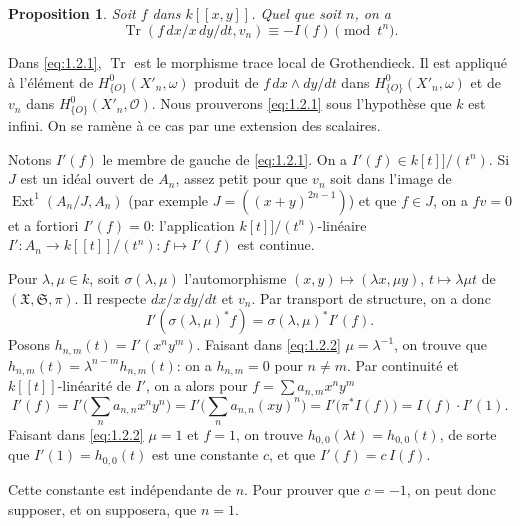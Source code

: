 \documentclass[12pt,a4paper]{article}
\theoremstyle{plain}
\newtheorem{proposition}{Proposition}
\theoremstyle{definition}
\theoremstyle{remark}
\DeclareMathOperator{\Ext}{Ext}
\DeclareMathOperator{\Tr}{Tr}
\newcommand{\OO}{\mathcal{O}}
\providecommand{\Ext}{\operatorname{Ext}}
\providecommand{\Tr}{\operatorname{Tr}}
\begin{document}
\subsection{}

\begin{proposition}\label{prop:1.2}
Soit $f$ dans $k[[x,y]]$. Quel que soit $n$, on a
\begin{equation}\label{eq:1.2.1}
\Tr(f\,dx/x\,dy/dt, v_n)\equiv -I(f)\pmod{t^n}.
\end{equation}
\end{proposition}

Dans \eqref{eq:1.2.1}, $\Tr$ est le morphisme trace local de Grothendieck. Il est
appliqué à l'élément de $H^0_{\{O\}}(X'_n,\omega)$ produit de $f\,dx\wedge dy/dt$ dans
$H^0_{\{O\}}(X'_n,\omega)$ et de $v_n$ dans $H^0_{\{O\}}(X'_n,\OO)$. Nous prouverons
\eqref{eq:1.2.1} sous l'hypothèse que $k$ est infini. On se ramène à ce cas par une
extension des scalaires.

Notons $I'(f)$ le membre de gauche de \eqref{eq:1.2.1}. On a
$I'(f)\in k[t]]/(t^n)$. Si $J$ est un idéal ouvert de $A_n$, assez petit pour que $v_n$
soit dans l'image de $\Ext^1(A_n/J,A_n)$ (par exemple $J=((x+y)^{2n-1})$) et que
$f\in J$, on a $fv=0$ et a fortiori $I'(f)=0$: l'application $k[t]]/(t^n)$-linéaire
$I':A_n\to k[[t]]/(t^n):f\mapsto I'(f)$ est continue.

Pour $\lambda,\mu\in k$, soit $\sigma(\lambda,\mu)$ l'automorphisme
$(x,y)\mapsto(\lambda x,\mu y)$, $t\mapsto\lambda\mu t$ de $(\mathfrak{X},\mathfrak{S},\pi)$.
Il respecte $dx/x\,dy/dt$ et $v_n$. Par transport de structure, on a donc
\begin{equation}\label{eq:1.2.2}
I'(\sigma(\lambda,\mu)^*f)=\sigma(\lambda,\mu)^*I'(f).
\end{equation}
Posons $h_{n,m}(t)=I'(x^ny^m)$. Faisant dans \eqref{eq:1.2.2} $\mu=\lambda^{-1}$, on trouve que
$h_{n,m}(t)=\lambda^{n-m}h_{n,m}(t)$: on a $h_{n,m}=0$ pour $n\neq m$. Par continuité et
$k[[t]]$-linéarité de $I'$, on a alors pour $f=\sum a_{n,m}x^ny^m$
\[
I'(f)=I'\bigl(\sum_n a_{n,n}x^ny^n\bigr)=I'\bigl(\sum_n a_{n,n}(xy)^n\bigr)=I'\bigl(\pi^*I(f)\bigr)=I(f)\cdot I'(1).
\]
Faisant dans \eqref{eq:1.2.2} $\mu=1$ et $f=1$, on trouve $h_{0,0}(\lambda t)=h_{0,0}(t)$,
de sorte que $I'(1)=h_{0,0}(t)$ est une constante $c$, et que $I'(f)=c\,I(f)$.

Cette constante est indépendante de $n$. Pour prouver que $c=-1$, on peut donc
supposer, et on supposera, que $n=1$.
\end{document}
